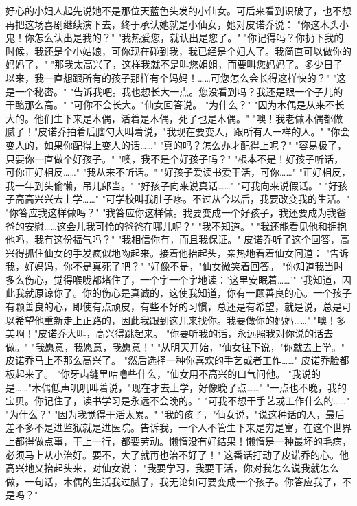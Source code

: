 \documentclass[12pt,UTF8]{ctexbook}
\begin{document}
好心的小妇人起先说她不是那位天蓝色头发的小仙女。可后来看到识破了，也不想再把这场喜剧继续演下去，终于承认她就是小仙女，她对皮诺乔说：
"你这木头小鬼！你怎么认出是我的？"
"我热爱您，就认出是您了。"
"你记得吗？你扔下我的时候，我还是个小姑娘，可你现在碰到我，我已经是个妇人了。我简直可以做你的妈妈了，"
"那我太高兴了，这样我就不是叫您姐姐，而要叫您妈妈了。多少日子以来，我一直想跟所有的孩子那样有个妈妈！……可您怎么会长得这样快的？"
"这是一个秘密。"
"告诉我吧。我也想长大一点。您没看到吗？我还是跟一个子儿的干酪那么高。"
"可你不会长大。"仙女回答说。
"为什么？"
"因为木偶是从来不长大的。他们生下来是木偶，活着是木偶，死了也是木偶。"
"噢！我老做木偶都做腻了！"皮诺乔拍着后脑勺大叫着说，"我现在要变人，跟所有人一样的人。"
"你会变人的，如果你配得上变人的话……"
"真的吗？怎么办才配得上呢？"
"容易极了，只要你一直做个好孩子。"
"噢，我不是个好孩子吗？"
"根本不是！好孩子听话，可你正好相反……"
"我从来不听话。"
"好孩子爱读书爱干活，可你……"
"正好相反，我一年到头偷懒，吊儿郎当。"
"好孩子向来说真话……"
"可我向来说假话。"
"好孩子高高兴兴去上学……"
"可学校叫我肚子疼。不过从今以后，我要改变我的生活。"
"你答应我这样做吗？"
"我答应你这样做。我要变成一个好孩子，我还要成为我爸爸的安慰……这会儿我可怜的爸爸在哪儿呢？"
"我不知道。"
"我还能看见他和拥抱他吗，我有这份福气吗？"
"我相信你有，而且我保证。"
皮诺乔听了这个回答，高兴得抓住仙女的手发疯似地吻起来。接着他抬起头，亲热地看着仙女问道：
"告诉我，好妈妈，你不是真死了吧？"
"好像不是，"仙女微笑着回答。
"你知道我当时多么伤心，觉得喉咙都堵住了，一个字一个字地读：'这里安眠着……'"
"我知道，因此我就原谅你了。你的伤心是真诚的，这使我知道，你有一顾善良的心。一个孩子有颗善良的心，即使有点顽皮，有些不好的习惯，总还是有希望，就是说，总是可以希望他重新走上正路的，因此我跟到这儿来找你。我要做你的妈妈……"
"噢！多美啊！"皮诺乔大叫，高兴得跳起来。
"你要听我的话，永远照我对你说的话去做。"
"我愿意，我愿意，我愿意！"
"从明天开始，"仙女往下说，"你就去上学。"
皮诺乔马上不那么高兴了。
"然后选择一种你喜欢的手艺或者工作……"
皮诺乔脸都板起来了。
"你牙齿缝里咕噜些什么，"仙女用不高兴的口气问他。
"我说的是……"木偶低声叽叽叫着说，"现在才去上学，好像晚了点……"
"一点也不晚，我的宝贝。你记住了，读书学习是永远不会晚的。"
"可我不想干手艺或工作什么的……"
"为什么？"
"因为我觉得干活太累。"
"我的孩子，"仙女说，"说这种话的人，最后差不多不是进监狱就是进医院。告诉我，一个人不管生下来是穷是富，在这个世界上都得做点事，干上一行，都要劳动。懒惰没有好结果！懒惰是一种最坏的毛病，必须马上从小治好。要不，大了就再也治不好了！"
这番话打动了皮诺乔的心。他高兴地又抬起头来，对仙女说：
"我要学习，我要干活，你对我怎么说我就怎么做，一句话，木偶的生活我过腻了，我无论如可要变成一个孩子。你答应我了，不是吗？"
\end{document}
